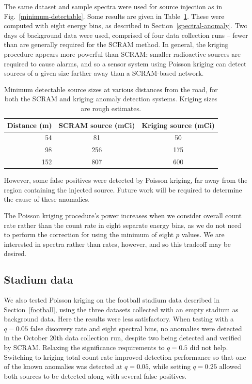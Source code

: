 The same dataset and sample spectra were used for source injection as in
Fig.~\ref{minimum-detectable}. Some results are given in
Table~\ref{krige-detectable}. These were computed with eight energy bins, as
described in Section~\ref{spectral-anomaly}. Two days of background data were
used, comprised of four data collection runs -- fewer than are generally
required for the SCRAM method. In general, the kriging procedure appears more
powerful than SCRAM: smaller radioactive sources are required to cause alarms,
and so a sensor system using Poisson kriging can detect sources of a given size
farther away than a SCRAM-based network.

\begin{table}
  \centering
  \begin{tabular}{r| c c}
    Distance (m) & SCRAM source (mCi) & Kriging source (mCi)
    \\\hline
    54 & 81 & 50\\
    98 & 256 & 175\\
    152 & 807 & 600
  \end{tabular}
  \caption{Minimum detectable source sizes at various distances from the road,
    for both the SCRAM and kriging anomaly detection systems. Kriging sizes are
    rough estimates.}
  \label{krige-detectable}
\end{table}

However, some false positives were detected by Poisson kriging, far away from
the region containing the injected source. Future work will be required to
determine the cause of these anomalies.

The Poisson kriging procedure's power increases when we consider overall count
rate rather than the count rate in eight separate energy bins, as we do not need
to perform the correction for using the minimum of eight \(p\) values. We are
interested in spectra rather than rates, however, and so this tradeoff may be
desired.

\subsection{Stadium data}

We also tested Poisson kriging on the football stadium data described in
Section~\ref{football}, using the three datasets collected with an empty stadium
as background data. Here the results were less satisfactory. When testing with a
\(q = 0.05\) false discovery rate and eight spectral bins, no anomalies were
detected in the October 20th data collection run, despite two being detected and
verified by SCRAM. Relaxing the significance requirements to \(q = 0.5\) did not
help. Switching to kriging total count rate improved detection performance so
that one of the known anomalies was detected at \(q=0.05\), while setting
\(q=0.25\) allowed both sources to be detected along with several false
positives.

